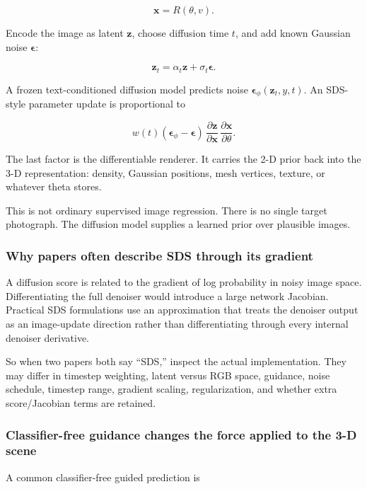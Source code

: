\[\mathbf x=R(\theta,v).\]

Encode the image as latent \(\mathbf z\), choose diffusion time \(t\), and add known Gaussian noise \(\boldsymbol\epsilon\):

\[\mathbf z_t=\alpha_t\mathbf z+\sigma_t\boldsymbol\epsilon.\]

A frozen text-conditioned diffusion model predicts noise \(\boldsymbol\epsilon_\phi(\mathbf z_t,y,t)\). An SDS-style parameter update is proportional to

\[w(t)(\boldsymbol\epsilon_\phi-\boldsymbol\epsilon)\,\frac{\partial\mathbf z}{\partial\mathbf x}\,\frac{\partial\mathbf x}{\partial\theta}.\]

The last factor is the differentiable renderer. It carries the 2-D prior back into the 3-D representation: density, Gaussian positions, mesh vertices, texture, or whatever theta stores.

This is not ordinary supervised image regression. There is no single target photograph. The diffusion model supplies a learned prior over plausible images.

\subsubsection{Why papers often describe SDS through its gradient}\label{04-visual-computing-ii-ch035-why-papers-often-describe-sds-through-its-gradient}

A diffusion score is related to the gradient of log probability in noisy image space. Differentiating the full denoiser would introduce a large network Jacobian. Practical SDS formulations use an approximation that treats the denoiser output as an image-update direction rather than differentiating through every internal denoiser derivative.

So when two papers both say ``SDS,'' inspect the actual implementation. They may differ in timestep weighting, latent versus RGB space, guidance, noise schedule, timestep range, gradient scaling, regularization, and whether extra score/Jacobian terms are retained.

\subsubsection{Classifier-free guidance changes the force applied to the 3-D scene}\label{04-visual-computing-ii-ch035-classifier-free-guidance-changes-the-force-applied-to-the-3-d-scene}

A common classifier-free guided prediction is

